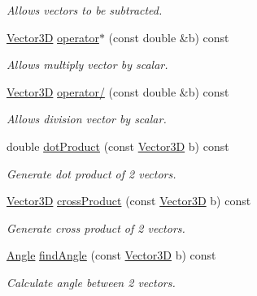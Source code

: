 \begin{DoxyCompactItemize}
\begin{DoxyCompactList}\small\item\em Allows vectors to be subtracted. \end{DoxyCompactList}\item 
\hypertarget{class_vector3_d_acb77478f27bcb44bab94a8b8610327ad}{\hyperlink{class_vector3_d}{Vector3\+D} \hyperlink{class_vector3_d_acb77478f27bcb44bab94a8b8610327ad}{operator$\ast$} (const double \&b) const }\label{class_vector3_d_acb77478f27bcb44bab94a8b8610327ad}

\begin{DoxyCompactList}\small\item\em Allows multiply vector by scalar. \end{DoxyCompactList}\item 
\hypertarget{class_vector3_d_afd918fd5c482a98b44b9451a0936dc0c}{\hyperlink{class_vector3_d}{Vector3\+D} \hyperlink{class_vector3_d_afd918fd5c482a98b44b9451a0936dc0c}{operator/} (const double \&b) const }\label{class_vector3_d_afd918fd5c482a98b44b9451a0936dc0c}

\begin{DoxyCompactList}\small\item\em Allows division vector by scalar. \end{DoxyCompactList}\item 
\hypertarget{class_vector3_d_a4cd2ffbcf4d714a07586dd4c545c3434}{double \hyperlink{class_vector3_d_a4cd2ffbcf4d714a07586dd4c545c3434}{dot\+Product} (const \hyperlink{class_vector3_d}{Vector3\+D} b) const }\label{class_vector3_d_a4cd2ffbcf4d714a07586dd4c545c3434}

\begin{DoxyCompactList}\small\item\em Generate dot product of 2 vectors. \end{DoxyCompactList}\item 
\hypertarget{class_vector3_d_a564d7170bafa8ac8e325603742eddc94}{\hyperlink{class_vector3_d}{Vector3\+D} \hyperlink{class_vector3_d_a564d7170bafa8ac8e325603742eddc94}{cross\+Product} (const \hyperlink{class_vector3_d}{Vector3\+D} b) const }\label{class_vector3_d_a564d7170bafa8ac8e325603742eddc94}

\begin{DoxyCompactList}\small\item\em Generate cross product of 2 vectors. \end{DoxyCompactList}\item 
\hypertarget{class_vector3_d_ac56e4b6a4eb4e39f344187e2ef085435}{\hyperlink{class_angle}{Angle} \hyperlink{class_vector3_d_ac56e4b6a4eb4e39f344187e2ef085435}{find\+Angle} (const \hyperlink{class_vector3_d}{Vector3\+D} b) const }\label{class_vector3_d_ac56e4b6a4eb4e39f344187e2ef085435}

\begin{DoxyCompactList}\small\item\em Calculate angle between 2 vectors. \end{DoxyCompactList}\end{DoxyCompactItemize}


